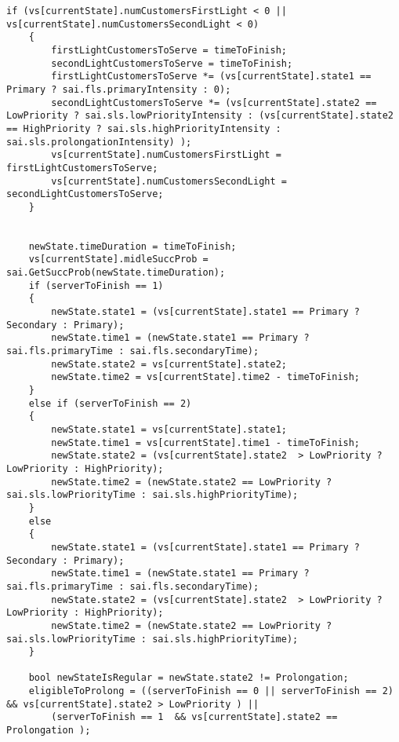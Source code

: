 \begin{lstlisting}[language={[ISO]C++}]
    if (vs[currentState].numCustomersFirstLight < 0 || vs[currentState].numCustomersSecondLight < 0)
    {
        firstLightCustomersToServe = timeToFinish;
        secondLightCustomersToServe = timeToFinish;
        firstLightCustomersToServe *= (vs[currentState].state1 == Primary ? sai.fls.primaryIntensity : 0);
        secondLightCustomersToServe *= (vs[currentState].state2 == LowPriority ? sai.sls.lowPriorityIntensity : (vs[currentState].state2 == HighPriority ? sai.sls.highPriorityIntensity : sai.sls.prolongationIntensity) );
        vs[currentState].numCustomersFirstLight = firstLightCustomersToServe;
        vs[currentState].numCustomersSecondLight = secondLightCustomersToServe;
    }

  
    newState.timeDuration = timeToFinish;
    vs[currentState].midleSuccProb = sai.GetSuccProb(newState.timeDuration);
    if (serverToFinish == 1)
    {
        newState.state1 = (vs[currentState].state1 == Primary ? Secondary : Primary);
        newState.time1 = (newState.state1 == Primary ? sai.fls.primaryTime : sai.fls.secondaryTime);
        newState.state2 = vs[currentState].state2;
        newState.time2 = vs[currentState].time2 - timeToFinish;
    }
    else if (serverToFinish == 2)
    {
        newState.state1 = vs[currentState].state1;
        newState.time1 = vs[currentState].time1 - timeToFinish;
        newState.state2 = (vs[currentState].state2  > LowPriority ? LowPriority : HighPriority);
        newState.time2 = (newState.state2 == LowPriority ? sai.sls.lowPriorityTime : sai.sls.highPriorityTime);
    }
    else
    {
        newState.state1 = (vs[currentState].state1 == Primary ? Secondary : Primary);
        newState.time1 = (newState.state1 == Primary ? sai.fls.primaryTime : sai.fls.secondaryTime);
        newState.state2 = (vs[currentState].state2  > LowPriority ? LowPriority : HighPriority);
        newState.time2 = (newState.state2 == LowPriority ? sai.sls.lowPriorityTime : sai.sls.highPriorityTime);
    }

    bool newStateIsRegular = newState.state2 != Prolongation;
    eligibleToProlong = ((serverToFinish == 0 || serverToFinish == 2) && vs[currentState].state2 > LowPriority ) ||
        (serverToFinish == 1  && vs[currentState].state2 == Prolongation );


\end{lstlisting}
